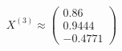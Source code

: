 \documentclass[preview]{standalone}
\begin{document}
\begin{align*}
X^{(3)} \approx \begin{pmatrix} 0.86 \\ 0.9444 \\ -0.4771 \end{pmatrix}
\end{align*}
\end{document}
